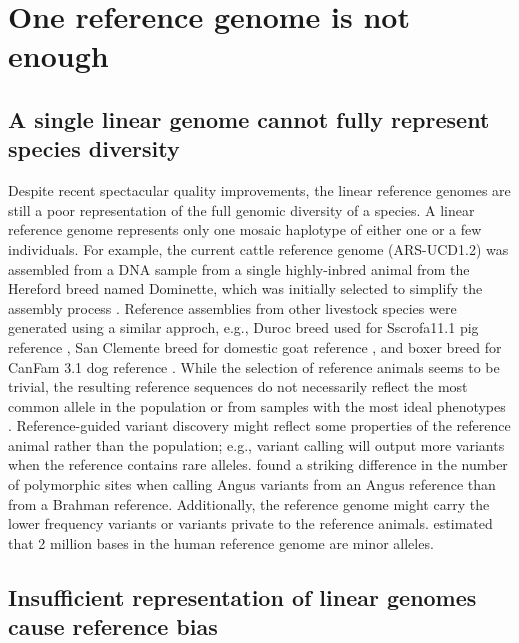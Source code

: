 \documentclass[../main.tex]{subfiles}
\begin{document}
\section{One reference genome is not enough}

\subsection{A single linear genome cannot fully represent species diversity}

Despite recent spectacular quality improvements, the linear reference genomes are still a poor representation of the full genomic diversity of a species. A linear reference genome represents only one mosaic haplotype of either one or a few individuals. For example, the current cattle reference genome (ARS-UCD1.2) was assembled from a DNA sample from a single highly-inbred animal from the Hereford breed named Dominette, which was initially selected to simplify the assembly process \citep{rosen2020novo}. Reference assemblies from  other livestock species were generated using a similar approch, e.g., Duroc breed used for Sscrofa11.1 pig reference \citep{warr2020improved}, San Clemente breed for domestic goat reference \citep{bickhart2017single}, and boxer breed for  CanFam 3.1 dog reference \citep{lindblad2005genome}. While the selection of reference animals seems to be trivial, the resulting reference sequences do not necessarily reflect the most common allele in the population or from samples with the most ideal phenotypes \citep{ballouz2019time}. Reference-guided variant discovery might reflect some properties of the reference animal rather than the population; e.g., variant calling will output more variants when the reference  contains rare alleles. \citet{low2019haplotype} found a striking difference in the number of polymorphic sites when calling Angus variants from an Angus reference than from a Brahman reference. Additionally, the reference genome might carry the lower frequency variants or variants private to the reference animals. \citep{shukla2019hg19kindel,ballouz2019time} estimated that 2 million bases in the human reference genome are minor alleles. 

\subsection{Insufficient representation of linear genomes cause reference bias}
\end{document}
